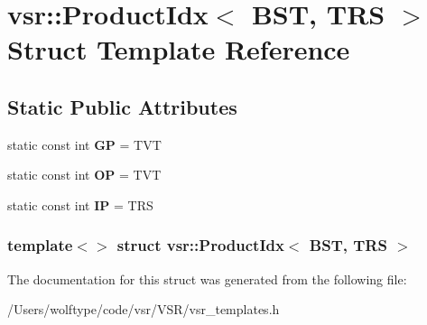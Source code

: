 \hypertarget{structvsr_1_1_product_idx_3_01_b_s_t_00_01_t_r_s_01_4}{\section{vsr\-:\-:Product\-Idx$<$ B\-S\-T, T\-R\-S $>$ Struct Template Reference}
\label{structvsr_1_1_product_idx_3_01_b_s_t_00_01_t_r_s_01_4}
}
\subsection*{Static Public Attributes}
\begin{DoxyCompactItemize}
\item 
\hypertarget{structvsr_1_1_product_idx_3_01_b_s_t_00_01_t_r_s_01_4_a343bd3db2089bcc8dcc1e86cb2972db4}{static const int {\bfseries G\-P} = T\-V\-T}\label{structvsr_1_1_product_idx_3_01_b_s_t_00_01_t_r_s_01_4_a343bd3db2089bcc8dcc1e86cb2972db4}

\item 
\hypertarget{structvsr_1_1_product_idx_3_01_b_s_t_00_01_t_r_s_01_4_a2449a37dcacd558cacc4785751b297a8}{static const int {\bfseries O\-P} = T\-V\-T}\label{structvsr_1_1_product_idx_3_01_b_s_t_00_01_t_r_s_01_4_a2449a37dcacd558cacc4785751b297a8}

\item 
\hypertarget{structvsr_1_1_product_idx_3_01_b_s_t_00_01_t_r_s_01_4_a8e75e0004502cb4cd31626e07ce8c272}{static const int {\bfseries I\-P} = T\-R\-S}\label{structvsr_1_1_product_idx_3_01_b_s_t_00_01_t_r_s_01_4_a8e75e0004502cb4cd31626e07ce8c272}

\end{DoxyCompactItemize}
\subsubsection*{template$<$$>$ struct vsr\-::\-Product\-Idx$<$ B\-S\-T, T\-R\-S $>$}



The documentation for this struct was generated from the following file\-:\begin{DoxyCompactItemize}
\item 
/\-Users/wolftype/code/vsr/\-V\-S\-R/vsr\-\_\-templates.\-h\end{DoxyCompactItemize}
